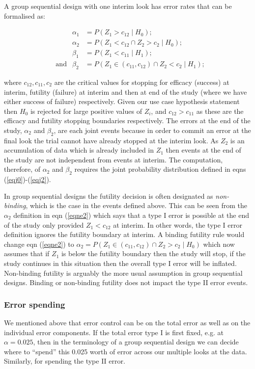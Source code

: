 \documentclass{article}
\begin{document}
A group sequential design with one interim look has error rates that can be formalised as:
\begin{fleqn}
\begin{align}
&&\alpha_1&=P(Z_{1}>c_ {12}\mid{H_ 0});\label{eqne1}\\[2pt]
&&\alpha_2&=P(Z_{1}<c_ {12} \cap Z_{2}>c_ {2}\mid{H_ 0});\label{eqne2}\\[2pt]
&&\beta_1&=P(Z_{1}<c_ {11}\mid{H_ 1});\label{eqne3}\\[2pt]
&\text{and}&\beta_2&=P(Z_ {1}\in(c_{11},c_{12}) \cap Z_{2}<c_ {2}\mid{H_ 1});\label{eqne4}
\end{align}
\end{fleqn}
where $c_{12},c_{11},c_2$ are the critical values for stopping for efficacy (success) at interim, futility (failure) at interim and then at end of the study (where we have either success of failure) respectively. Given our use case hypothesis statement then $H_0$ is rejected for large positive values of $Z_i$, and $c_{12}>c_{11}$ as these are the efficacy and futility stopping boundaries respectively. The errors at the end of the study, $\alpha_2$ and $\beta_2$, are each joint events because in order to commit an error at the final look the trial cannot have already stopped at the interim look. As $Z_2$ is an accumulation of data which is already included in $Z_1$ then events at the end of the study are not independent from events at interim. The computation, therefore, of $\alpha_2$ and $\beta_2$ requires the joint probability distribution defined in eqns (\ref{eqj0})-(\ref{eqj2}). 

In group sequential designs the futility decision is often designated as \emph{non-binding}, which is the case in the events defined above. This can be seen from the $\alpha_2$ definition in eqn (\ref{eqne2}) which says that a type I error is possible at the end of the study only provided $Z_1<c_ {12}$ at interim. In other words, the type I error definition ignores the futility boundary at interim. A binding futility rule would change eqn (\ref{eqne2}) to $\alpha_2=P(Z_ {1}\in(c_{11},c_{12}) \cap Z_{2}>c_ {2}\mid{H_ 0})$ which now assumes that if $Z_1$ is below the futility boundary then the study will stop, if the study continues in this situation then the overall type I error will be inflated. Non-binding futility is arguably the more usual assumption in group sequential designs.  Binding or non-binding futility does not impact the type II error events. 

\subsubsection{Error spending}
We mentioned above that error control can be on the total error as well as on the individual error components. If the total error type I is first fixed, e.g. at $\alpha=0.025$, then in the terminology of a group sequential design we can decide where to ``spend'' this 0.025 worth of error across our multiple looks at the data. Similarly, for spending the type II error. 
\end{document}
